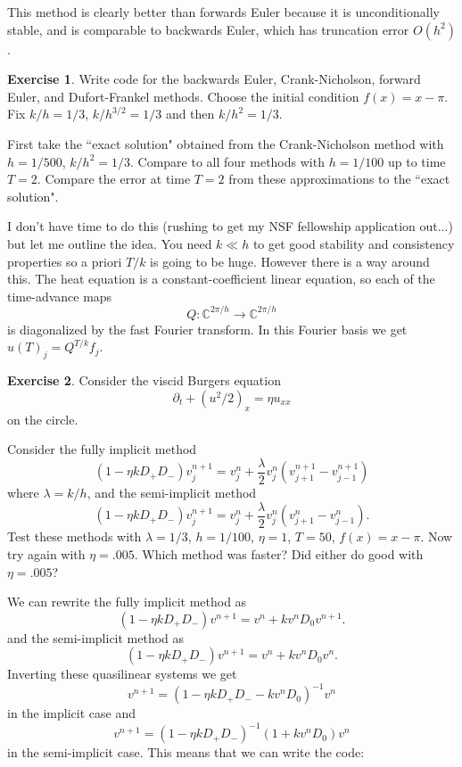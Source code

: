 \documentclass[10pt]{article}
\newcommand{\CC}{\mathbb{C}}
\theoremstyle{definition}
\newtheorem{exer}{Exercise}
\begin{document}
This method is clearly better than forwards Euler because it is unconditionally stable, and is comparable to backwards Euler, which has truncation error $O(h^2)$.

\begin{exer}
Write code for the backwards Euler, Crank-Nicholson, forward Euler, and Dufort-Frankel methods.
Choose the initial condition $f(x) = x - \pi$.
Fix $k/h = 1/3$, $k/h^{3/2} = 1/3$ and then $k/h^2 = 1/3$.

First take the ``exact solution" obtained from the Crank-Nicholson method with $h = 1/500$, $k/h^2 = 1/3$.
Compare to all four methods with $h = 1/100$ up to time $T = 2$.
Compare the error at time $T = 2$ from these approximations to the ``exact solution".
\end{exer}

I don't have time to do this (rushing to get my NSF fellowship application out...) but let me outline the idea.
You need $k \ll h$ to get good stability and consistency properties so a priori $T/k$ is going to be huge.
However there is a way around this.
The heat equation is a constant-coefficient linear equation, so each of the time-advance maps
$$Q: \CC^{2\pi/h} \to \CC^{2\pi/h}$$
is diagonalized by the fast Fourier transform.
In this Fourier basis we get $u(T)_j = Q^{T/k} f_j$.

\begin{exer}
Consider the viscid Burgers equation
$$\partial_t + (u^2/2)_x = \eta u_{xx}$$
on the circle.

Consider the fully implicit method
$$(1 - \eta k D_+ D_-) v_j^{n + 1} = v_j^n + \frac{\lambda}{2} v_j^n(v_{j+1}^{n+1} - v_{j-1}^{n+1})$$
where $\lambda = k/h$, and the semi-implicit method
$$(1 - \eta k D_+ D_-) v_j^{n + 1} = v_j^n + \frac{\lambda}{2} v_j^n(v_{j+1}^n - v_{j-1}^n).$$
Test these methods with $\lambda = 1/3$, $h = 1/100$, $\eta = 1$, $T = 50$, $f(x) = x - \pi$.
Now try again with $\eta = .005$.
Which method was faster? Did either do good with $\eta = .005$?
\end{exer}

We can rewrite the fully implicit method as
$$(1 - \eta k D_+ D_-) v^{n + 1} = v^n + k v^n D_0 v^{n+1}.$$
and the semi-implicit method as
$$(1 - \eta k D_+ D_-) v^{n + 1} = v^n + k v^n D_0 v^n.$$
Inverting these quasilinear systems we get
$$v^{n + 1} = (1 - \eta k D_+ D_- - k v^n D_0)^{-1} v^n$$
in the implicit case and
$$v^{n + 1} = (1 - \eta k D_+ D_-)^{-1}(1 + kv^n D_0) v^n$$
in the semi-implicit case.
This means that we can write the code:
\end{document}
